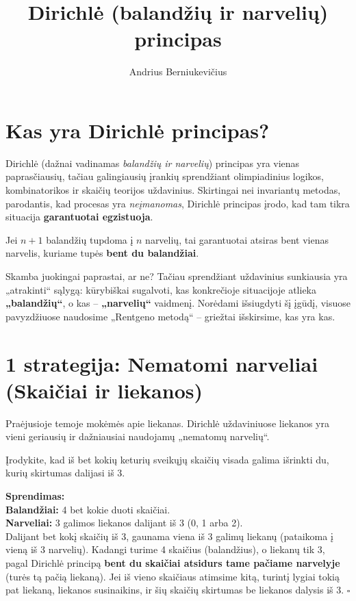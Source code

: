 \documentclass[11pt,a4paper]{scrartcl}
\title{Dirichlė (balandžių ir narvelių) principas}
\author{Andrius Berniukevičius}
\newenvironment{solution}
    {\begin{list}{}{\setlength{\leftmargin}{10pt}\setlength{\rightmargin}{10pt}}\item[]}
    {\end{list}}
\begin{document}
\maketitle

\section{Kas yra Dirichlė principas?}

Dirichlė (dažnai vadinamas \textit{balandžių ir narvelių}) principas yra vienas paprasčiausių, tačiau galingiausių įrankių sprendžiant olimpiadinius logikos, kombinatorikos ir skaičių teorijos uždavinius. Skirtingai nei invariantų metodas, parodantis, kad procesas yra \textit{neįmanomas}, Dirichlė principas įrodo, kad tam tikra situacija \textbf{garantuotai egzistuoja}.

\begin{theorem}
Jei $n+1$ balandžių tupdoma į $n$ narvelių, tai garantuotai atsiras bent vienas narvelis, kuriame tupės \textbf{bent du balandžiai}.
\end{theorem}

Skamba juokingai paprastai, ar ne? Tačiau sprendžiant uždavinius sunkiausia yra „atrakinti“ sąlygą: kūrybiškai sugalvoti, kas konkrečioje situacijoje atlieka \textbf{„balandžių“}, o kas – \textbf{„narvelių“} vaidmenį. 
Norėdami išsiugdyti šį įgūdį, visuose pavyzdžiuose naudosime „Rentgeno metodą“ – griežtai išskirsime, kas yra kas.

\section{1 strategija: Nematomi narveliai (Skaičiai ir liekanos)}

Praėjusioje temoje mokėmės apie liekanas. Dirichlė uždaviniuose liekanos yra vieni geriausių ir dažniausiai naudojamų „nematomų narvelių“.

\begin{example}
Įrodykite, kad iš bet kokių keturių sveikųjų skaičių visada galima išrinkti du, kurių skirtumas dalijasi iš 3.
\end{example}

\begin{solution}
\textbf{Sprendimas:} \\
\textbf{Balandžiai:} 4 bet kokie duoti skaičiai.\\
\textbf{Narveliai:} 3 galimos liekanos dalijant iš 3 (0, 1 arba 2).\\

Dalijant bet kokį skaičių iš 3, gaunama viena iš 3 galimų liekanų (pataikoma į vieną iš 3 narvelių). Kadangi turime 4 skaičius (balandžius), o liekanų tik 3, pagal Dirichlė principą \textbf{bent du skaičiai atsidurs tame pačiame narvelyje} (turės tą pačią liekaną). 
Jei iš vieno skaičiaus atimsime kitą, turintį lygiai tokią pat liekaną, liekanos susinaikins, ir šių skaičių skirtumas be liekanos dalysis iš 3. \hfill $\square$
\end{solution}
\end{document}
